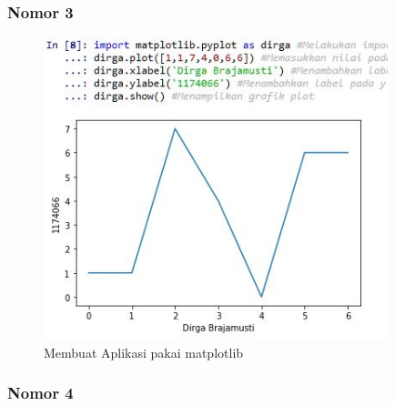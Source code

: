 \subsubsection{Nomor 3}
\hfill\break

\begin{figure}[H]
\centerline{\includegraphics[width=10cm]{figures/1174066/3/6.jpg}}
\caption{Membuat Aplikasi pakai matplotlib}
\label{labelgambar}
\end{figure}

\subsubsection{Nomor 4}
\hfill\break

